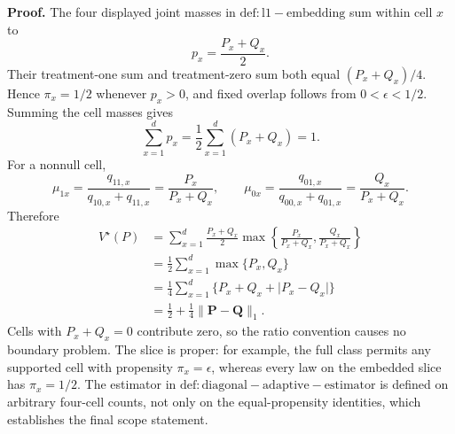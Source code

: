 \textbf{Proof.}
The four displayed joint masses in \(\mathrm{def:l1-embedding}\) sum within cell \(x\) to
\[
 p_x=\frac{P_x+Q_x}{2}.
\]
Their treatment-one sum and treatment-zero sum both equal \((P_x+Q_x)/4\).  Hence \(\pi_x=1/2\) whenever \(p_x>0\), and fixed overlap follows from \(0<\epsilon<1/2\).  Summing the cell masses gives
\[
 \sum_{x=1}^dp_x=\frac12\sum_{x=1}^d(P_x+Q_x)=1.
\]
For a nonnull cell,
\[
 \mu_{1x}=\frac{q_{11,x}}{q_{10,x}+q_{11,x}}
 =\frac{P_x}{P_x+Q_x},
 \qquad
 \mu_{0x}=\frac{q_{01,x}}{q_{00,x}+q_{01,x}}
 =\frac{Q_x}{P_x+Q_x}.
\]
Therefore
\[
 \begin{aligned}
 V^\star(P)
 &=\sum_{x=1}^d\frac{P_x+Q_x}{2}
       \max\!\left\{\frac{P_x}{P_x+Q_x},\frac{Q_x}{P_x+Q_x}\right\}\\
 &=\frac12\sum_{x=1}^d\max\{P_x,Q_x\}\\
 &=\frac14\sum_{x=1}^d\{P_x+Q_x+\lvert P_x-Q_x\rvert\}\\
 &=\frac12+\frac14\lVert\mathbf P-\mathbf Q\rVert_1.
 \end{aligned}
\]
Cells with \(P_x+Q_x=0\) contribute zero, so the ratio convention causes no boundary problem.  The slice is proper: for example, the full class permits any supported cell with propensity \(\pi_x=\epsilon\), whereas every law on the embedded slice has \(\pi_x=1/2\).  The estimator in \(\mathrm{def:diagonal-adaptive-estimator}\) is defined on arbitrary four-cell counts, not only on the equal-propensity identities, which establishes the final scope statement.